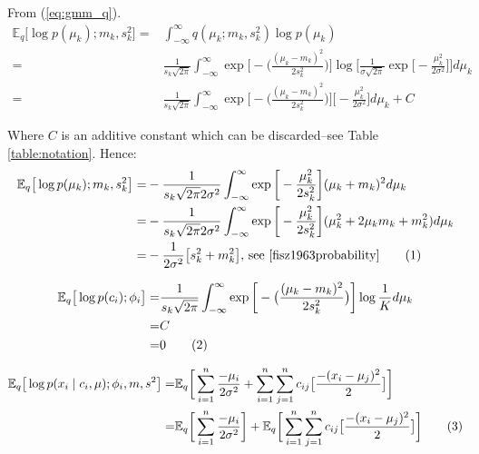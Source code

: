\documentclass[]{article}
\newcommand{\Expectation} {\mathbb{E}}
\newcommand\numberthis    {\addtocounter{equation}{1}\tag{\theequation}}
\begin{document}
From (\ref{eq:gmm_q}).
\begin{align*}
	 \Expectation_q \big[ \log {p(\mu_k);m_k,s_k^2}\big] =& \int_{-\infty}^{\infty} q(\mu_k;m_k,s_k^2) \log {p(\mu_k)} \\
	 =& \frac{1}{s_k\sqrt{2\pi}} \int_{-\infty}^{\infty} \exp{\bigg[-\big(\frac{(\mu_k-m_k)^2}{2 s_k^2}\big)\bigg]}\log{\bigg[\frac{1}{\sigma\sqrt{2\pi}} \exp{\big[- \frac{\mu_k^2}{2\sigma^2}\big]}\bigg]} d\mu_k\\
	 =&\frac{1}{s_k\sqrt{2\pi}} \int_{-\infty}^{\infty} \exp{\bigg[-\big(\frac{(\mu_k-m_k)^2}{2 s_k^2}\big)\bigg]}\bigg[ - \frac{\mu_k^2}{2\sigma^2}\bigg] d\mu_k+ C 
\end{align*}

Where $C$ is an additive constant which can be discarded--see Table \ref{table:notation}. Hence:
\begin{align*}
		 \Expectation_q \big[ \log {p(\mu_k);m_k,s_k^2}\big] =& - \frac{1}{s_k\sqrt{2\pi} 2 \sigma^2} \int_{-\infty}^{\infty} \exp{\bigg[-\frac{\mu_k^2}{2 s_k^2}\bigg]}(\mu_k+m_k)^2 d\mu_k\\
		 =&- \frac{1}{s_k\sqrt{2\pi} 2 \sigma^2} \int_{-\infty}^{\infty} \exp{\bigg[-\frac{\mu_k^2}{2 s_k^2}\bigg]}(\mu_k^2 +2 \mu_k m_k + m_k^2) d\mu_k\\
		 =&- \frac{1}{2 \sigma^2} \big[s_k^2 +  m_k^2\big] \text{, see  \cite[(5.7.5)]{fisz1963probability}} \numberthis \label{eq:ELBO:1}
\end{align*}

\begin{align*}
	\Expectation_q\big[\log{p(c_i);\phi_i}\big] =& \frac{1}{s_k\sqrt{2\pi}} \int_{-\infty}^{\infty} \exp{\bigg[-\big(\frac{(\mu_k-m_k)^2}{2 s_k^2}\big)\bigg]} \log{\frac{1}{K}} d \mu_k\\
	=& C\\
	=&0 \numberthis \label{eq:ELBO:2}
\end{align*}

\begin{align*}
	\Expectation_q\big[\log{p(x_i\mid c_i,\mu);\phi_i,m,s^2}\big] =& \Expectation_q\bigg[\sum_{i=1}^{n} \frac{-\mu_i}{2\sigma^2}+\sum_{i=1}^{n}\sum_{j=1}^{n} c_{ij}\big[\frac{-(x_i-\mu_j)^2}{2}\big]\bigg]\\
	=&\Expectation_q\bigg[\sum_{i=1}^{n} \frac{-\mu_i}{2\sigma^2}\bigg]+\Expectation_q\bigg[\sum_{i=1}^{n}\sum_{j=1}^{n} c_{ij}\big[\frac{-(x_i-\mu_j)^2}{2}\big]\bigg] \numberthis \label{eq:ELBO:3}
\end{align*}
\end{document}
